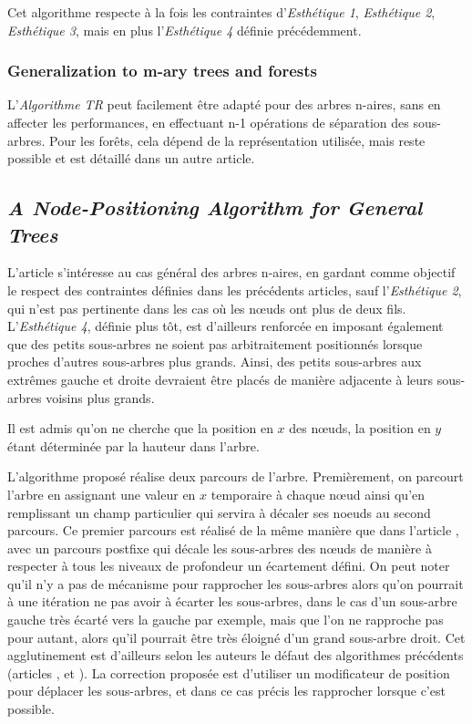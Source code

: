\documentclass{article}
\begin{document}
  Cet algorithme respecte à la fois les contraintes d'\emph{Esthétique 1}, \emph{Esthétique 2}, \emph{Esthétique 3}, mais en plus l'\emph{Esthétique 4} définie précédemment.
  
  
  \subsubsection{Generalization to m-ary trees and forests}
  L'\emph{Algorithme TR} peut facilement être adapté pour des arbres n-aires, sans en affecter les performances, en effectuant n-1 opérations de séparation des sous-arbres.
  Pour les forêts, cela dépend de la représentation utilisée, mais reste possible et est détaillé dans un autre article.
  
  \subsection{\emph{A Node-Positioning Algorithm for General Trees}}
  
  L'article \cite{article90} s'intéresse au cas général des arbres n-aires, en gardant comme objectif le respect des contraintes définies dans les précédents articles, sauf l'\emph{Esthétique 2}, qui n'est pas pertinente dans les cas où les n\oe{}uds ont plus de deux fils.
  L'\emph{Esthétique 4}, définie plus tôt, est d'ailleurs renforcée en imposant également que des petits sous-arbres ne soient pas arbitraitement positionnés lorsque proches d'autres sous-arbres plus grands.
  Ainsi, des petits sous-arbres aux extrêmes gauche et droite devraient être placés de manière adjacente à leurs sous-arbres voisins plus grands.
  
  Il est admis qu'on ne cherche que la position en $x$ des n\oe{}uds, la position en $y$ étant déterminée par la hauteur dans l'arbre.
  
  L'algorithme proposé réalise deux parcours de l'arbre. Premièrement, on parcourt l'arbre en assignant une valeur en $x$ temporaire à chaque n\oe{}ud ainsi qu'en remplissant un champ particulier qui servira à décaler ses noeuds au second parcours. Ce premier parcours est réalisé de la même manière que dans l'article \cite{article81}, avec un parcours postfixe qui décale les sous-arbres des n\oe{}uds de manière à respecter à tous les niveaux de profondeur un écartement défini. On peut noter qu'il n'y a pas de mécanisme pour rapprocher les sous-arbres alors qu'on pourrait à une itération ne pas avoir à écarter les sous-arbres, dans le cas d'un sous-arbre gauche très écarté vers la gauche par exemple, mais que l'on ne rapproche pas pour autant, alors qu'il pourrait être très éloigné d'un grand sous-arbre droit. Cet agglutinement est d'ailleurs selon les auteurs le défaut des algorithmes précédents (articles \cite{article79}, et \cite{article81}).
  La correction proposée est d'utiliser un modificateur de position pour déplacer les sous-arbres, et dans ce cas précis les rapprocher lorsque c'est possible.
  
\end{document}
